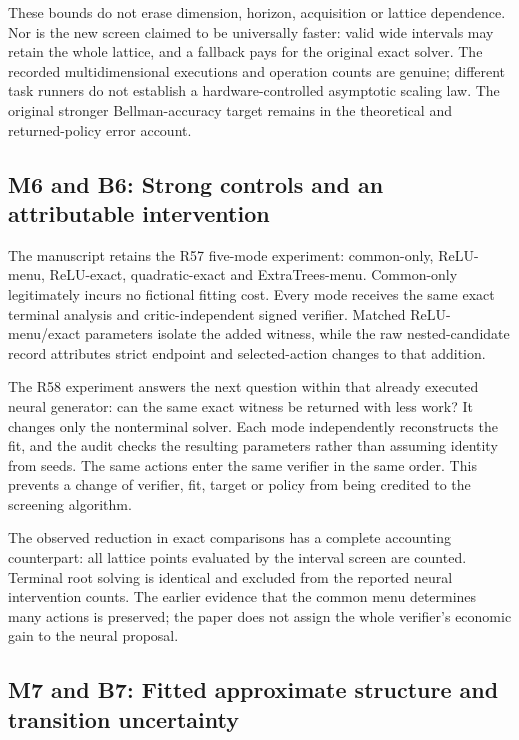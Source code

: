 These bounds do not erase dimension, horizon, acquisition or lattice
dependence. Nor is the new screen claimed to be universally faster:
valid wide intervals may retain the whole lattice, and a fallback pays
for the original exact solver. The recorded multidimensional executions
and operation counts are genuine; different task runners do not
establish a hardware-controlled asymptotic scaling law. The original
stronger Bellman-accuracy target remains in the theoretical and
returned-policy error account.

\hypertarget{m6-and-b6-strong-controls-and-an-attributable-intervention}{%
\subsection{M6 and B6: Strong controls and an attributable
intervention}\label{m6-and-b6-strong-controls-and-an-attributable-intervention}}

The manuscript retains the R57 five-mode experiment: common-only,
ReLU-menu, ReLU-exact, quadratic-exact and ExtraTrees-menu. Common-only
legitimately incurs no fictional fitting cost. Every mode receives the
same exact terminal analysis and critic-independent signed verifier.
Matched ReLU-menu/exact parameters isolate the added witness, while the
raw nested-candidate record attributes strict endpoint and
selected-action changes to that addition.

The R58 experiment answers the next question within that already
executed neural generator: can the same exact witness be returned with
less work? It changes only the nonterminal solver. Each mode
independently reconstructs the fit, and the audit checks the resulting
parameters rather than assuming identity from seeds. The same actions
enter the same verifier in the same order. This prevents a change of
verifier, fit, target or policy from being credited to the screening
algorithm.

The observed reduction in exact comparisons has a complete accounting
counterpart: all lattice points evaluated by the interval screen are
counted. Terminal root solving is identical and excluded from the
reported neural intervention counts. The earlier evidence that the
common menu determines many actions is preserved; the paper does not
assign the whole verifier's economic gain to the neural proposal.

\hypertarget{m7-and-b7-fitted-approximate-structure-and-transition-uncertainty}{%
\subsection{M7 and B7: Fitted approximate structure and transition
uncertainty}\label{m7-and-b7-fitted-approximate-structure-and-transition-uncertainty}}

